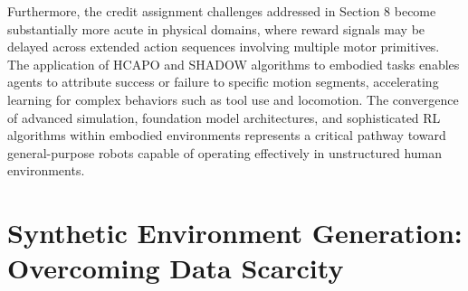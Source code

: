 Furthermore, the credit assignment challenges addressed in Section 8 become substantially more acute in physical domains, where reward signals may be delayed across extended action sequences involving multiple motor primitives. The application of HCAPO and SHADOW algorithms to embodied tasks enables agents to attribute success or failure to specific motion segments, accelerating learning for complex behaviors such as tool use and locomotion. The convergence of advanced simulation, foundation model architectures, and sophisticated RL algorithms within embodied environments represents a critical pathway toward general-purpose robots capable of operating effectively in unstructured human environments.
\section{ Synthetic Environment Generation: Overcoming Data Scarcity}

